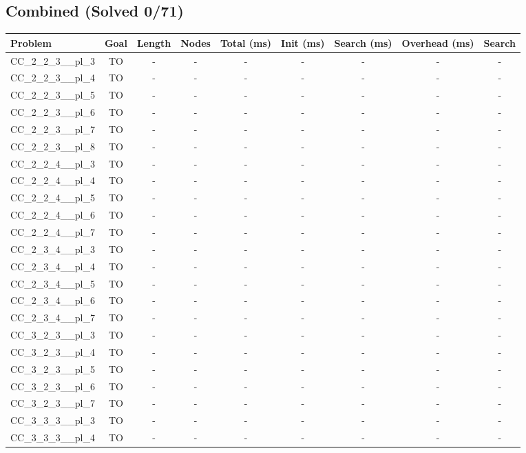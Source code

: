 \documentclass{article}
\begin{document}
\subsection*{Combined (Solved 0/71)}
\begin{tabular}{lcccccccc}
\toprule
Problem & Goal & Length & Nodes & Total (ms) & Init (ms) & Search (ms) & Overhead (ms) & Search \\
\midrule
CC\_2\_2\_3\_\_pl\_3 & TO & - & - & - & - & - & - & - \\
CC\_2\_2\_3\_\_pl\_4 & TO & - & - & - & - & - & - & - \\
CC\_2\_2\_3\_\_pl\_5 & TO & - & - & - & - & - & - & - \\
CC\_2\_2\_3\_\_pl\_6 & TO & - & - & - & - & - & - & - \\
CC\_2\_2\_3\_\_pl\_7 & TO & - & - & - & - & - & - & - \\
CC\_2\_2\_3\_\_pl\_8 & TO & - & - & - & - & - & - & - \\
CC\_2\_2\_4\_\_pl\_3 & TO & - & - & - & - & - & - & - \\
CC\_2\_2\_4\_\_pl\_4 & TO & - & - & - & - & - & - & - \\
CC\_2\_2\_4\_\_pl\_5 & TO & - & - & - & - & - & - & - \\
CC\_2\_2\_4\_\_pl\_6 & TO & - & - & - & - & - & - & - \\
CC\_2\_2\_4\_\_pl\_7 & TO & - & - & - & - & - & - & - \\
CC\_2\_3\_4\_\_pl\_3 & TO & - & - & - & - & - & - & - \\
CC\_2\_3\_4\_\_pl\_4 & TO & - & - & - & - & - & - & - \\
CC\_2\_3\_4\_\_pl\_5 & TO & - & - & - & - & - & - & - \\
CC\_2\_3\_4\_\_pl\_6 & TO & - & - & - & - & - & - & - \\
CC\_2\_3\_4\_\_pl\_7 & TO & - & - & - & - & - & - & - \\
CC\_3\_2\_3\_\_pl\_3 & TO & - & - & - & - & - & - & - \\
CC\_3\_2\_3\_\_pl\_4 & TO & - & - & - & - & - & - & - \\
CC\_3\_2\_3\_\_pl\_5 & TO & - & - & - & - & - & - & - \\
CC\_3\_2\_3\_\_pl\_6 & TO & - & - & - & - & - & - & - \\
CC\_3\_2\_3\_\_pl\_7 & TO & - & - & - & - & - & - & - \\
CC\_3\_3\_3\_\_pl\_3 & TO & - & - & - & - & - & - & - \\
CC\_3\_3\_3\_\_pl\_4 & TO & - & - & - & - & - & - & - \\

\end{tabular}
\end{document}
